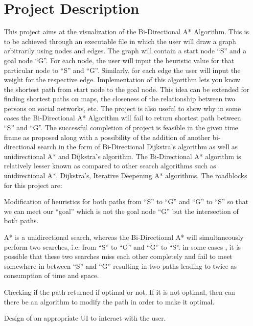 \documentclass[10pt,conference]{IEEEtran}
\begin{document}
\section{Project Description}\label{sec:1. Project Description}
{This project aims at the visualization of the Bi-Directional A* Algorithm. This is to be achieved through an executable file in which the user will draw a graph arbitrarily using nodes and edges. The graph will contain a start node ``S'' and a goal node ``G''. For each node, the user will input the heuristic value for that particular node to ``S'' and ``G''. Similarly, for each edge the user will input the weight for the respective edge. Implementation of this algorithm lets you know the shortest path from start node to the goal node. This idea can be extended for finding shortest paths on maps, the closeness of the relationship between two persons on social networks, etc. The project is also useful to show why in some cases the Bi-Directional A* Algorithm will fail to return shortest path between ``S'' and ``G''. 
The successful completion of project is feasible in the given time frame as proposed along with a possibility of the addition of another bi-directional search in the form of Bi-Directional Dijkstra's algorithm as well as unidirectional A* and Dijkstra's algorithm. The Bi-Directional A* algorithm is relatively lesser known as compared to other search algorithms such as unidirectional A*, Dijkstra's, Iterative Deepening A* algorithms. The roadblocks for this project are:
\begin{itemize}{ 
\item
{Modification of heuristics for both paths from ``S'' to ``G'' and ``G'' to ``S'' so that we can meet our ``goal'' which is not the goal node ``G'' but the intersection of both paths.}
\item{A* is a unidirectional search, whereas the Bi-Directional A* will simultaneously perform two searches, i.e. from ``S'' to ``G'' and ``G'' to ``S''. in some cases , it is possible that these two searches miss each other completely and fail to meet somewhere in between ``S'' and ``G'' resulting in two paths leading to twice as consumption of time and space.}
\item{Checking if the path returned if optimal or not. If it is not optimal, then can there be an algorithm to modify the path in order to make it optimal.}
\item{Design of an appropriate UI to interact with the user.}

}
\end{itemize}}
\end{document}
